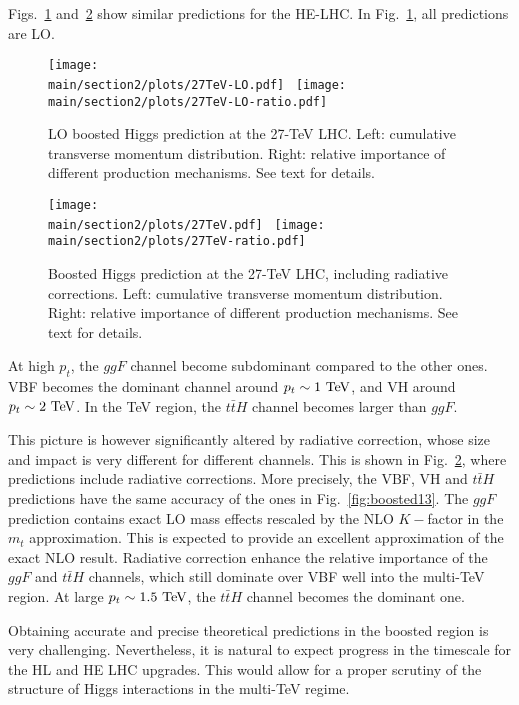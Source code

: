 Figs.~\ref{fig:boosted27-LO} and~\ref{fig:boosted27} show similar predictions for the HE-LHC. In Fig.~\ref{fig:boosted27-LO}, all predictions are LO. 
\begin{figure}[h]
\begin{center}
    \texttt{[image: \\main/section2/plots/27TeV-LO.pdf]}~
    \texttt{[image: \\main/section2/plots/27TeV-LO-ratio.pdf]}
    \caption{
    LO boosted Higgs prediction at the 27-TeV LHC. Left: cumulative transverse momentum distribution.
    Right: relative importance of different production mechanisms. See text for details. 
        \label{fig:boosted27-LO}}
        \end{center}
\end{figure}
\begin{figure}[h]
\begin{center}
    \texttt{[image: \\main/section2/plots/27TeV.pdf]}~
    \texttt{[image: \\main/section2/plots/27TeV-ratio.pdf]}
    \caption{
    Boosted Higgs prediction at the 27-TeV LHC, including radiative corrections. Left: cumulative transverse momentum distribution.
    Right: relative importance of different production mechanisms. See text for details. 
        \label{fig:boosted27}}
        \end{center}
\end{figure}
At high $p_t$, the $ggF$ channel become subdominant compared to the other ones. VBF becomes the dominant channel around  $p_t\sim 1~{\rm TeV}$, 
and VH around $p_t\sim 2~{\rm TeV}$. In the TeV region, the $t\bar t H$ channel becomes larger than $ggF$. 

This picture is however significantly altered by radiative correction, whose size and impact is very different for different channels. 
This is shown in Fig.~\ref{fig:boosted27}, where predictions include radiative corrections. More precisely, the VBF, VH and $t\bar t H$ 
predictions have the same accuracy of the ones in Fig.~\ref{fig:boosted13}. The $ggF$ prediction contains exact LO mass effects rescaled
by the NLO $K-$factor in the $m_t$ approximation. This is expected to provide an excellent approximation of the exact NLO result. 
Radiative correction enhance the relative importance of the $ggF$ and $t\bar t H$ channels, which still dominate over VBF well into the
multi-TeV region. At large $p_t \sim 1.5~{\rm TeV}$, the $t\bar t H$ channel becomes the dominant one. 

Obtaining accurate and precise theoretical predictions in the boosted region is very challenging. Nevertheless, it is natural
to expect progress in the timescale for the HL and HE LHC upgrades. This would allow for a proper scrutiny of the structure of
Higgs interactions in the multi-TeV regime. 

